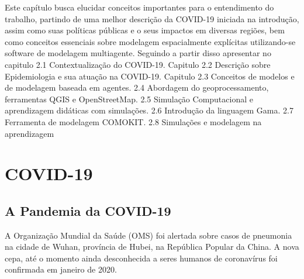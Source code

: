 \newcommand{\texCommand}[1]{\texttt{\textbackslash{#1}}}%

\newcommand{\exemplo}[1]{%
\vspace{\baselineskip}%
\noindent\fbox{\begin{minipage}{\textwidth}#1\end{minipage}}%
\\\vspace{\baselineskip}}%

\newcommand{\exemploVerbatim}[1]{%
\vspace{\baselineskip}%
\noindent\fbox{\begin{minipage}{\textwidth}%
#1\end{minipage}}%
\\\vspace{\baselineskip}}%


Este capítulo busca elucidar conceitos importantes para o entendimento do trabalho, partindo de uma melhor descrição da COVID-19 iniciada na introdução, assim como suas políticas públicas e o seus impactos em diversas regiões, bem como conceitos essenciais sobre modelagem espacialmente explícitas utilizando-se software de modelagem multiagente. Seguindo a partir disso apresentar no capitulo 2.1 Contextualização do COVID-19. Capitulo 2.2 Descrição sobre Epidemiologia e sua atuação na COVID-19. Capitulo 2.3 Conceitos de modelos e de modelagem baseada em agentes. 2.4 Abordagem do geoprocessamento, ferramentas QGIS e OpenStreetMap. 2.5 Simulação Computacional e aprendizagem didáticas com simulações. 2.6 Introdução da linguagem Gama. 2.7 Ferramenta de modelagem COMOKIT. 2.8 Simulações e modelagem na aprendizagem

\section{COVID-19}

\subsection{A Pandemia da COVID-19}

A Organização Mundial da Saúde (OMS) foi alertada sobre casos de pneumonia na cidade de Wuhan, província de Hubei, na República Popular da China. A nova cepa, até o momento ainda desconhecida a seres humanos de coronavírus foi confirmada em janeiro de 2020.

